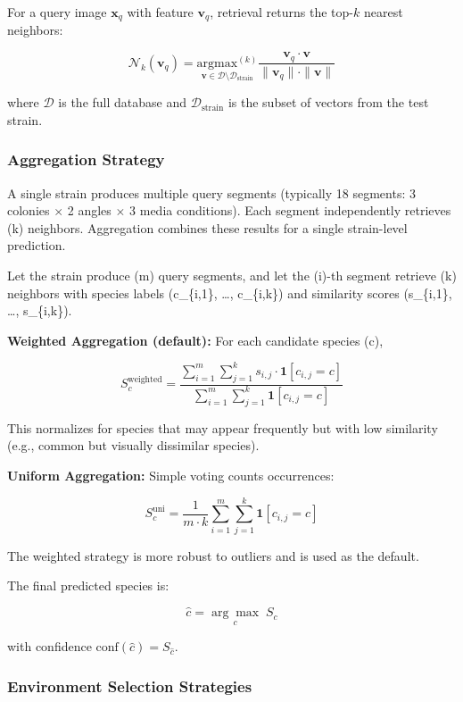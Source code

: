 For a query image \(\mathbf{x}_q\) with feature \(\mathbf{v}_q\), retrieval returns the top-\(k\) nearest neighbors:

\[ \mathcal{N}_k(\mathbf{v}_q) = \underset{\mathbf{v} \in \mathcal{D} \setminus \mathcal{D}_{\text{strain}}}{\text{argmax}^{(k)}} \frac{\mathbf{v}_q \cdot \mathbf{v}}{\|\mathbf{v}_q\| \cdot \|\mathbf{v}\|} \]

where $\mathcal{D}$ is the full database and $\mathcal{D}_{\text{strain}}$ is the subset of vectors from the test strain.

\subsubsection{Aggregation Strategy}\label{aggregation-strategy}

A single strain produces multiple query segments (typically 18 segments: 3 colonies $\times$ 2 angles $\times$ 3 media conditions). Each segment independently retrieves (k) neighbors. Aggregation combines these results for a single strain-level prediction.

Let the strain produce (m) query segments, and let the (i)-th segment retrieve (k) neighbors with species labels (c\_\{i,1\}, \ldots, c\_\{i,k\}) and similarity scores (s\_\{i,1\}, \ldots, s\_\{i,k\}).

\textbf{Weighted Aggregation (default):} For each candidate species (c),

\[ S_c^{\text{weighted}} = \frac{\sum_{i=1}^{m} \sum_{j=1}^{k} s_{i,j} \cdot \mathbf{1}[c_{i,j} = c]}{\sum_{i=1}^{m} \sum_{j=1}^{k} \mathbf{1}[c_{i,j} = c]} \]

This normalizes for species that may appear frequently but with low similarity (e.g., common but visually dissimilar species).

\textbf{Uniform Aggregation:} Simple voting counts occurrences:

\[ S_c^{\text{uni}} = \frac{1}{m \cdot k} \sum_{i=1}^{m} \sum_{j=1}^{k} \mathbf{1}[c_{i,j} = c] \]

The weighted strategy is more robust to outliers and is used as the default.

The final predicted species is:

\[ \hat{c} = \underset{c}{\arg\max} \; S_c \]

with confidence $\text{conf}(\hat{c}) = S_{\hat{c}}$.

\subsubsection{Environment Selection Strategies}\label{environment-selection-strategies}

